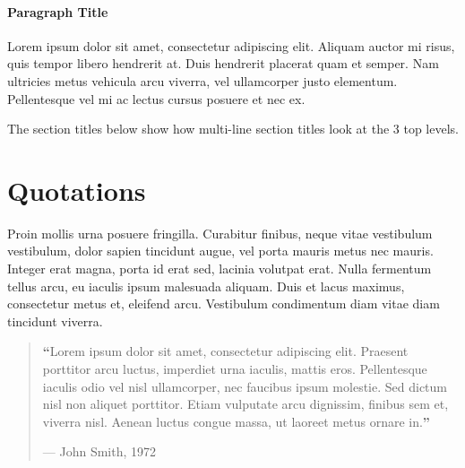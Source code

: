 \documentclass[
	a4paper, %
	12pt, %
]{include/CSSullivanBusinessReport}
\begin{document}
\paragraph{Paragraph Title} %

Lorem ipsum dolor sit amet, consectetur adipiscing elit. Aliquam auctor mi risus, quis tempor libero hendrerit at. Duis hendrerit placerat quam et semper. Nam ultricies metus vehicula arcu viverra, vel ullamcorper justo elementum. Pellentesque vel mi ac lectus cursus posuere et nec ex.

The section titles below show how multi-line section titles look at the 3 top levels.



\section{Quotations}

Proin mollis urna posuere fringilla. Curabitur finibus, neque vitae vestibulum vestibulum, dolor sapien tincidunt augue, vel porta mauris metus nec mauris. Integer erat magna, porta id erat sed, lacinia volutpat erat. Nulla fermentum tellus arcu, eu iaculis ipsum malesuada aliquam. Duis et lacus maximus, consectetur metus et, eleifend arcu. Vestibulum condimentum diam vitae diam tincidunt viverra. %

\begin{quote}
	\textbf{\LARGE ``}Lorem ipsum dolor sit amet, consectetur adipiscing elit. Praesent porttitor arcu luctus, imperdiet urna iaculis, mattis eros. Pellentesque iaculis odio vel nisl ullamcorper, nec faucibus ipsum molestie. Sed dictum nisl non aliquet porttitor. Etiam vulputate arcu dignissim, finibus sem et, viverra nisl. Aenean luctus congue massa, ut laoreet metus ornare in.\textbf{''}
	
	\hfill--- John Smith, 1972
\end{quote}
\end{document}
